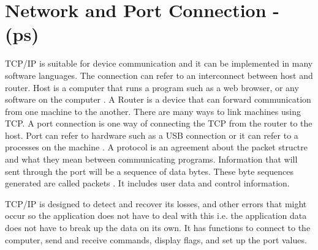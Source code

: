 \section{Network and Port Connection - (ps)}

TCP/IP is suitable for device communication and it can be implemented in many software languages.
The connection can refer to an interconnect between host and router.
Host is a computer that runs a program such as a web browser, or any software on the computer \cite{davidB}.
A Router is a device that can forward communication from one machine to the another.
There are many ways to link machines using TCP.
A port connection is one way of connecting the TCP from the router to the host.
Port can refer to hardware such as a USB connection or it can refer to a processes on the machine \cite{normanM}.
A protocol is an agreement about the packet structre and what they mean between communicating programs.
Information that will sent through the port will be a sequence of data bytes. 
These byte sequences generated are called packets \cite{davidB}.
It includes user data and control information.

TCP/IP is designed to detect and recover its losses, and other errors that might occur so the application does not have to deal with this \cite{davidB} i.e. the application data does not have to break up the data on its own. It has functions to connect to the computer, send and receive commands, display flags, and set up the port values.


 
